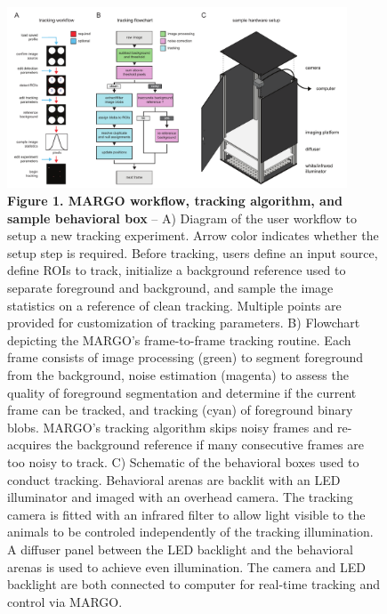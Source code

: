 \documentclass[10pt]{article}
\begin{document}
\newpage
\begin{figure}[h!]
	\begin{center}
		\includegraphics[width=0.9\textwidth]{../figures/autotracker_overview.pdf}
	\end{center}
	\caption*{\footnotesize \textbf{Figure 1. MARGO workflow, tracking algorithm, and sample behavioral box} -- A) Diagram of the user workflow to setup a new tracking experiment. Arrow color indicates whether the setup step is required. Before tracking, users define an input source, define ROIs to track, initialize a background reference used to separate foreground and background, and sample the image statistics on a reference of clean tracking. Multiple points are provided for customization of tracking parameters. B) Flowchart depicting the MARGO's frame-to-frame tracking routine. Each frame consists of image processing (green) to segment foreground from the background, noise estimation (magenta) to assess the quality of foreground segmentation and determine if the current frame can be tracked, and tracking (cyan) of foreground binary blobs. MARGO's tracking algorithm skips noisy frames and re-acquires the background reference if many consecutive frames are too noisy to track. C) Schematic of the behavioral boxes used to conduct tracking. Behavioral arenas are backlit with an LED illuminator and imaged with an overhead camera. The tracking camera is fitted with an infrared filter to allow light visible to the animals to be controled independently of the tracking illumination. A diffuser panel between the LED backlight and the behavioral arenas is used to achieve even illumination. The camera and LED backlight are both connected to computer for real-time tracking and control via MARGO.}
\end{figure}
\end{document}
